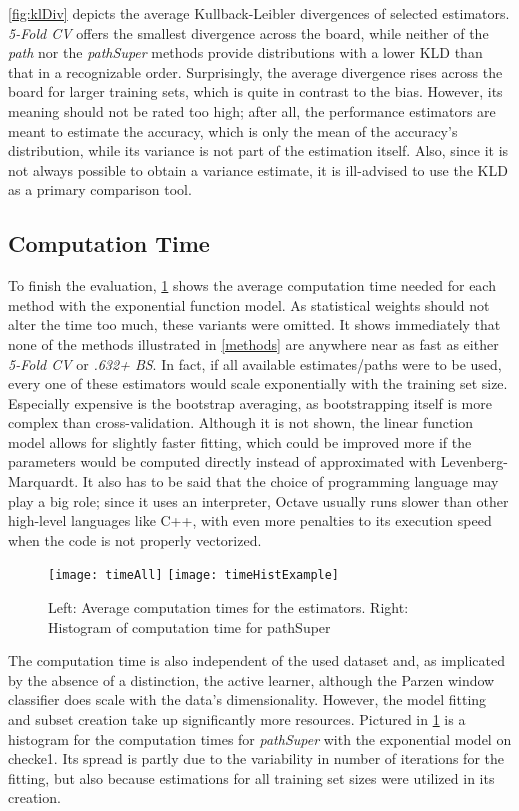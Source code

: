 \ref{fig:klDiv} depicts the average Kullback-Leibler divergences of selected estimators. \textit{5-Fold CV} offers the smallest divergence across the board, while neither of the \textit{path} nor the \textit{pathSuper} methods provide distributions with a lower KLD than that in a recognizable order. Surprisingly, the average divergence rises across the board for larger training sets, which is quite in contrast to the bias. However, its meaning should not be rated too high; after all, the performance estimators are meant to estimate the accuracy, which is only the mean of the accuracy's distribution, while its variance is not part of the estimation itself. Also, since it is not always possible to obtain a variance estimate, it is ill-advised to use the KLD as a primary comparison tool.

\subsection{Computation Time}

To finish the evaluation, \ref{fig:compTimeAll} shows the average computation time needed for each method with the exponential function model. As statistical weights should not alter the time too much, these variants were omitted. It shows immediately that none of the methods illustrated in \ref{methods} are anywhere near as fast as either \textit{5-Fold CV} or \textit{.632+ BS}. In fact, if all available estimates/paths were to be used, every one of these estimators would scale exponentially with the training set size. Especially expensive is the bootstrap averaging, as bootstrapping itself is more complex than cross-validation. Although it is not shown, the linear function model allows for slightly faster fitting, which could be improved more if the parameters would be computed directly instead of approximated with Levenberg-Marquardt. It also has to be said that the choice of programming language may play a big role; since it uses an interpreter, Octave usually runs slower than other high-level languages like C++, with even more penalties to its execution speed when the code is not properly vectorized.

\begin{figure}[h]
	\centering
	\texttt{[image: timeAll]}
	\texttt{[image: timeHistExample]}
	\caption{Left: Average computation times for the estimators. Right: Histogram of computation time for pathSuper}
	\label{fig:compTimeAll}
\end{figure}

The computation time is also independent of the used dataset and, as implicated by the absence of a distinction, the active learner, although the Parzen window classifier does scale with the data's dimensionality. However, the model fitting and subset creation take up significantly more resources. Pictured in \ref{fig:compTimeAll} is a histogram for the computation times for \textit{pathSuper} with the exponential model on checke1. Its spread is partly due to the variability in number of iterations for the fitting, but also because estimations for all training set sizes were utilized in its creation.